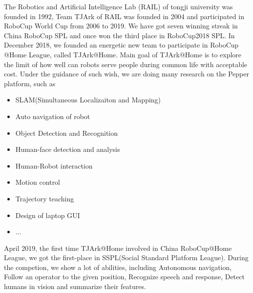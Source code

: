 The Robotics and Artificial Intelligence Lab (RAIL) of tongji university was founded in 1992, Team TJArk of RAIL was founded in 2004 and participated in RoboCup World Cup from 2006 to 2019. We have got seven winning streak in China RoboCup SPL and once won the third place in RoboCup2018 SPL.
In December 2018, we founded an energetic new team to participate in RoboCup @Home League, called TJArk@Home. Main goal of TJArk@Home is to explore the limit of how well can robots serve people during common life with acceptable cost. Under the guidance of such wish, we are doing many research on the Pepper platform, such as
\begin{itemize}
\item SLAM(Simultaneous Localizaiton and Mapping)
\item Auto navigation of robot
\item Object Detection and Recognition
\item Human-face detection and analysis
\item Human-Robot interaction
\item Motion control
\item Trajectory teaching
\item Design of laptop GUI
\item ...
\end{itemize}
April 2019,  the first time TJArk@Home involved in China RoboCup@Home League, we got the first-place in SSPL(Social Standard Platform League). 
During the competion, we show a lot of abilities, including 
Autonomous navigation, 
Follow an operator to the given position, 
Recognize speech and response, 
Detect humans in vision and summarize their features.
